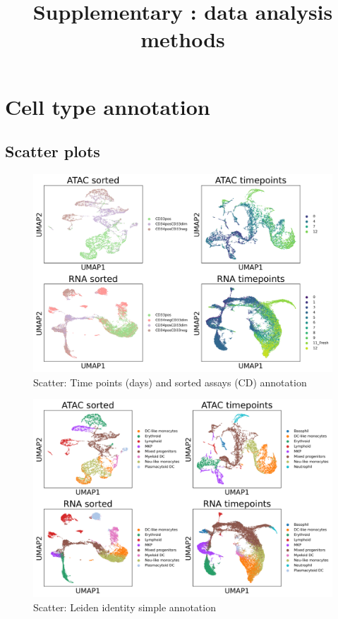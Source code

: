\documentclass[a4paper]{article}
\begin{document}
\title{Supplementary : data analysis methods}

\tableofcontents

\section{Cell type annotation}

\subsection{Scatter plots}

\begin{figure}[!htb]
  \centering
  \includegraphics[width=\textwidth]{../figures/hematopoiesis/label.png}
  \caption{Scatter: Time points (days) and sorted assays (CD) annotation}
\end{figure}

\begin{figure}[!htb]
  \centering
  \includegraphics[width=\textwidth]{../figures/hematopoiesis/leiden_identity_simple2.png}
  \caption{Scatter: Leiden identity simple annotation}
\end{figure}
\end{document}
